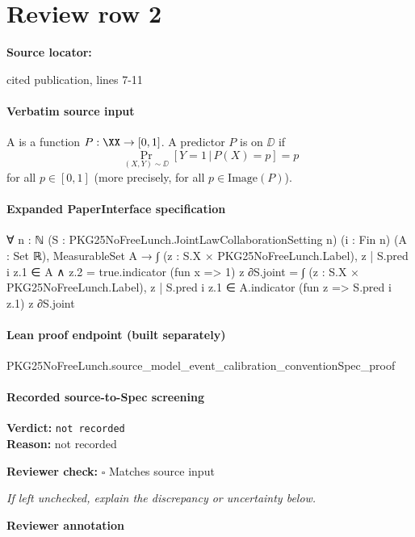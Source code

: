 \documentclass[10pt]{article}
\newcommand{\reviewerbox}{%
  \par\noindent\fbox{\parbox{0.96\linewidth}{\rule{0pt}{0.38in}}}\par
}
\newcommand{\reviewmatch}[1]{%
  \par\noindent\textbf{Reviewer check:} $\square$\; #1\par
  \noindent\emph{If left unchecked, explain the discrepancy or uncertainty below.}\par
}
\begin{document}
\section*{Review row 2}
\textbf{Source locator:} {\footnotesize\raggedright cited publication, lines 7-\allowbreak{}11\par}
\paragraph{Verbatim source input}
\begin{ReviewVerbatim}
A  is a function $P: \XX\rightarrow [0,1]$. A predictor $P$ is  on $\DD$ if
\begin{equation}
    \Pr_{(X,Y)\sim \DD}[Y=1\,|\,P(X)=p] = p
\end{equation}
for all $p\in [0,1]$ (more precisely, for all $p\in \text{Image}(P)$).
\end{ReviewVerbatim}


\paragraph{Expanded PaperInterface specification}
\begin{ReviewVerbatim}
∀ {n : ℕ} (S : PKG25NoFreeLunch.JointLawCollaborationSetting n) (i : Fin n) (A : Set ℝ),
  MeasurableSet A →
    ∫ (z : S.X × PKG25NoFreeLunch.Label), {z | S.pred i z.1 ∈ A ∧ z.2 = true}.indicator (fun x => 1) z ∂S.joint =
      ∫ (z : S.X × PKG25NoFreeLunch.Label), {z | S.pred i z.1 ∈ A}.indicator (fun z => S.pred i z.1) z ∂S.joint
\end{ReviewVerbatim}

\paragraph{Lean proof endpoint (built separately)}\begin{ReviewVerbatim}
PKG25NoFreeLunch.source_model_event_calibration_conventionSpec_proof
\end{ReviewVerbatim}

\paragraph{Recorded source-to-Spec screening}
\textbf{Verdict:} \texttt{not recorded}
\\
\textbf{Reason:} not recorded
\reviewmatch{Matches source input}
\noindent\textbf{Reviewer annotation}\par
\reviewerbox
\clearpage
\hypertarget{source-claim-6ba03b9e70eacd50}{}
\end{document}
